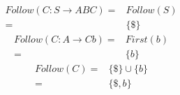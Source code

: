 \documentclass[fleqn]{article}
\begin{document}
\begin{enumerate}
  \begin{align*}
    Follow(C: S \rightarrow ABC) =& Follow(S)\\
                                 =& \{\$\}
  \end{align*}
  \begin{align*}
    Follow(C: A \rightarrow Cb) =& First(b)\\
                                =& \{b\}
  \end{align*}
  \begin{align*}
    Follow(C) =& \{\$\} \cup \{b\}\\
              =& \{\$, b\}
  \end{align*}
\end{enumerate}
\end{document}
